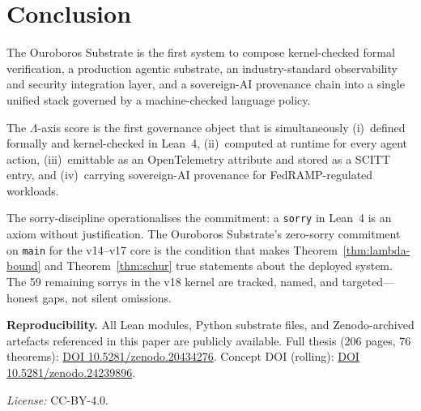 \documentclass[11pt,letterpaper]{article}
\theoremstyle{definition}
\theoremstyle{remark}
\begin{document}
\section{Conclusion}
\label{sec:conclusion}

The Ouroboros Substrate is the first system to compose
kernel-checked formal verification, a production agentic substrate,
an industry-standard observability and security integration layer,
and a sovereign-AI provenance chain into a single unified stack
governed by a machine-checked language policy.

The \(\Lambda\)-axis score is the first governance object that is
simultaneously (i)~defined formally and kernel-checked in Lean~4,
(ii)~computed at runtime for every agent action,
(iii)~emittable as an OpenTelemetry attribute and stored as a SCITT
entry, and (iv)~carrying sovereign-AI provenance for FedRAMP-regulated
workloads.

The sorry-discipline operationalises the commitment: a
\texttt{sorry} in Lean~4 is an axiom without justification.
The Ouroboros Substrate's zero-sorry commitment on \texttt{main}
for the v14--v17 core is the condition that makes
Theorem~\ref{thm:lambda-bound} and Theorem~\ref{thm:schur}
true statements about the deployed system.
The 59 remaining sorrys in the v18 kernel are tracked, named, and
targeted---honest gaps, not silent omissions.

\medskip

\noindent\textbf{Reproducibility.}
All Lean modules, Python substrate files, and Zenodo-archived artefacts
referenced in this paper are publicly available.
Full thesis (206 pages, 76 theorems):
\href{https://doi.org/10.5281/zenodo.20434276}{DOI 10.5281/zenodo.20434276}.
Concept DOI (rolling):
\href{https://doi.org/10.5281/zenodo.24239896}{DOI 10.5281/zenodo.24239896}.

\medskip

\noindent\textit{License:} CC-BY-4.0.

\printbibliography[heading=bibintoc,title={References}]
\end{document}
